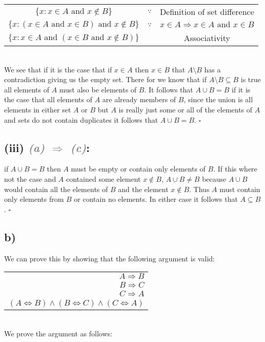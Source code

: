 \documentclass{article}
\begin{document}
\begin{table}[htp]
    \centering
    \begin{tabular}{ccc}
        $\{x:x\in A \text{ and }x\not\in B\}$ & $\because$ & Definition of set difference\\
        $\{x:(x\in A \text{ and } x\in B) \text{ and } x\not\in B\}$ & $\because$ & $x\in A \Rightarrow x\in A \text{ and } x\in B$\\
        $\{x:x\in A \text{ and } (x\in B \text{ and } x\not\in B)\}$ & & Associativity \\
    \end{tabular}
\end{table}


 \\
We see that if it is the case that if $x\in A$ then $x\in B$ that $A\setminus B$ has a contradiction giving us the empty set. There for we know that if $A\setminus B \subseteq B$ is true all elements of $A$ must also be elements of $B$. It follows that $A \cup B = B$ if it is the case that all elements of $A$ are already members of $B$, since the union is all elements in either set $A$ or $B$ but $A$ is really just some or all of the elements of $A$ and sets do not contain duplicates it follows that $A\cup B=B$. $\square$

\subsection*{(iii) \textcolor{gray}{\small{\textit{(a) $\Rightarrow$ (c)}}}:} 
if $A \cup B = B$ then $A$ must be empty or contain only elements of $B$. If this where not the case and $A$ contained some element $x\not\in B$, $A\cup B \neq B$ because $A\cup B$ would contain all the elements of $B$ and the element $x\not\in B$. Thus $A$ must contain only elements from $B$ or contain no elements. In either case it follows that $A \subseteq B$. $\square$
\newpage
\subsection*{b)}
We can prove this by showing that the following argument is valid: 

\begin{table}[htp]
    \centering
    \begin{tabular}{r}
        $A\Rightarrow B$\\
        $B\Rightarrow C$\\
        $C\Rightarrow A$\\
        \hline
        $(A \Leftrightarrow B) \land (B \Leftrightarrow C) \land( C \Leftrightarrow A)$
    \end{tabular}
\end{table}
 \\
We prove the argument as follows:
\end{document}
